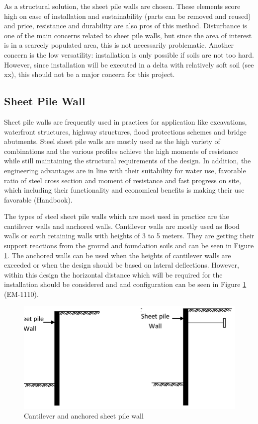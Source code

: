 As a structural solution, the sheet pile walls are chosen. These elements score high on ease of installation and sustainability (parts can be removed and reused) and price, resistance and durability are also pros of this method. Disturbance is one of the main concerns related to sheet pile walls, but since the area of interest is in a scarcely populated area, this is not necessarily problematic. Another concern is the low versatility: installation is only possible if soils are not too hard. However, since installation will be executed in a delta with relatively soft soil (see xx), this should not be a major concern for this project.

\subsection{Sheet Pile Wall}
\label{section:sheet_pile_wall}

Sheet pile walls are frequently used in practices for application like excavations, waterfront structures, highway structures, flood protections schemes and bridge abutments. Steel sheet pile walls are mostly used as the high variety of combinations and the various profiles achieve the high moments of resistance while still maintaining the structural requirements of the design. In addition, the engineering advantages are in line with their suitability for water use, favorable ratio of steel cross section and moment of resistance and fast progress on site, which including their functionality and economical benefits is making their use favorable (Handbook).

The types of steel sheet pile walls which are most used in practice are the cantilever walls and anchored walls. Cantilever walls are mostly used as flood walls or earth retaining walls with heights of 3 to 5 meters. They are getting their support reactions from the ground and foundation soils and can be seen in Figure \ref{fig:sheetpiles}. The anchored walls can be used when the heights of cantilever walls are exceeded or when the design should be based on lateral deflections. However, within this design the horizontal distance which will be required for the installation should be considered and and configuration can be seen in Figure \ref{fig:sheetpiles} (EM-1110).

\begin{figure}[H]
    \centering
    \includegraphics[width=0.50\linewidth]{figures/ch8/Anchored-Sheet-pile-wall.png}
    \caption{Cantilever and anchored sheet pile wall}
    \label{fig:sheetpiles}
\end{figure}

